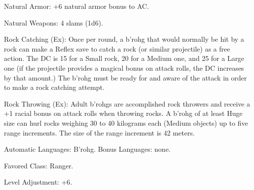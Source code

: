 \begin{itemize*}
    \item Natural Armor: +6 natural armor bonus to AC.
    \item Natural Weapons: 4 slams (1d6).
    \item Rock Catching (Ex): Once per round, a b'rohg that would normally be hit by a rock can make a Reflex save to catch a rock (or similar projectile) as a free action. The DC is 15 for a Small rock, 20 for a Medium one, and 25 for a Large one (if the projectile provides a magical bonus on attack rolls, the DC increases by that amount.) The b'rohg must be ready for and aware of the attack in order to make a rock catching attempt.
    \item Rock Throwing (Ex): Adult b'rohgs are accomplished rock throwers and receive a +1 racial bonus on attack rolls when throwing rocks. A b'rohg of at least Huge size can hurl rocks weighing 30 to 40 kilograms each (Medium objects) up to five range increments. The size of the range increment is 42 meters.
    \item Automatic Languages: B'rohg. Bonus Languages: none.
    \item Favored Class: Ranger.
    \item Level Adjustment: +6.
\end{itemize*}

